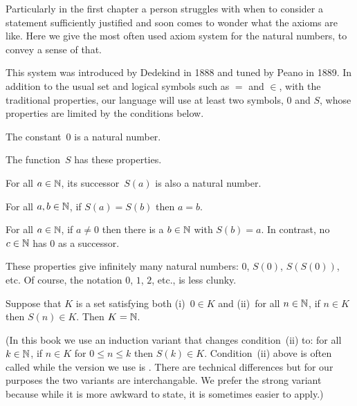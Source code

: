\documentclass{ibl}
\begin{document}
Particularly in the 
first chapter a person struggles with when to consider a 
statement sufficiently justified 
and soon comes to wonder what the axioms are like.
Here we give the most often used axiom system for the natural numbers, to
convey a sense of that. 

This system was 
introduced by Dedekind in 1888 and tuned by Peano in 1889.
In addition to the usual set and logical symbols such as $=$ and $\in$,
with the traditional properties, 
our language will use at least two symbols, $0$ and $S$, whose 
properties are limited by the conditions below.

\begin{ax}
The constant~$0$ is a natural number.
\end{ax}

\begin{ax}
The  function~$S$ has these properties.
\begin{exes}
\item {} For all $a\in\mathbb{N}$, its successor~$S(a)$ is also 
  a natural number.
\item {} For all $a,b\in\mathbb{N}$, if $S(a)=S(b)$ then $a=b$.
\item {}
  For all $a\in\mathbb{N}$, if $a\neq 0$ then there is a $b\in\mathbb{N}$ with $S(b)=a$.
  In contrast, no $c\in\mathbb{N}$ has $0$ as a successor.  
\end{exes}
\end{ax}


These properties give infinitely many natural numbers:
$0$, $S(0)$, $S(S(0))$, etc.
Of course, the notation $0$, $1$, $2$, etc., is less clunky.

\begin{ax}[Induction]
  Suppose that $K$ is a set satisfying both (i)~$0\in K$
  and (ii)~for all $n\in\mathbb{N}$, if $n\in K$ then $S(n)\in K$.
  Then $K=\mathbb{N}$.
\end{ax}

\noindent (In this book we use an induction variant that changes
condition~(ii) to: for all $k\in\mathbb{N}$,  
if $n\in K$ for $0\leq n\leq k$ then $S(k)\in K$.
Condition~(ii) above is often called  while
the version we use is .
There are technical differences but for our purposes
the two variants are interchangable. 
We prefer the strong variant because while it is 
more awkward to state, it is sometimes easier to apply.)
\end{document}
